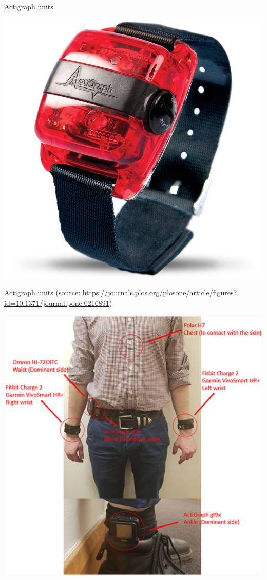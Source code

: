 \documentclass[
10pt]{beamer}
\begin{document}
\begin{frame}{Actigraph units}
 
 \begin{center}
  \includegraphics[scale=0.25]{figs/img_showcase_wgt3x-bt.png}
 \end{center}

 
\end{frame}

\begin{frame}{Actigraph units (source: \url{https://journals.plos.org/plosone/article/figures?id=10.1371/journal.pone.0216891})}
 
 \begin{center}
  \includegraphics[scale=1.5]{figs/MultipleAccelerometers.png}
 \end{center}
 
\end{frame}
\end{document}
